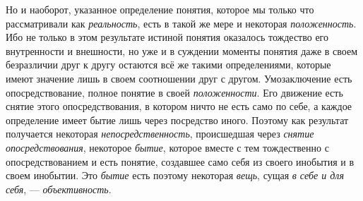 \documentclass[twoside]{article}
\begin{document}
{{{{{{Но и наоборот, указанное определение понятия, которое мы
только что рассматривали как
{\em реальность}, есть в
такой же мере и некоторая
{\em положенность}. Ибо
не только в этом результате истиной понятия оказалось тождество его
внутренности и внешности, но уже и в суждении моменты понятия даже в своем
безразличии друг к другу остаются всё же такими определениями, которые
имеют значение лишь в своем соотношении друг с другом. Умозаключение есть
опосредствование, полное понятие в своей
{\em положенности}. Его
движение есть снятие этого опосредствования, в котором ничто не есть само
по себе, а каждое определение имеет бытие лишь через посредство иного. 
Поэтому как результат получается некоторая
{\em непосредственность},
происшедшая через
{\em снятие опосредствования},
некоторое {\em бытие},
которое вместе с тем тождественно с опосредствованием и есть
понятие, создавшее само себя из своего инобытия и в своем инобытии. Это
{\em бытие} есть поэтому
некоторая {\em вещь},
сущая {\em в себе и для
себя}, — {\em объективность}.

\bigskip

}}}}}}
\end{document}
